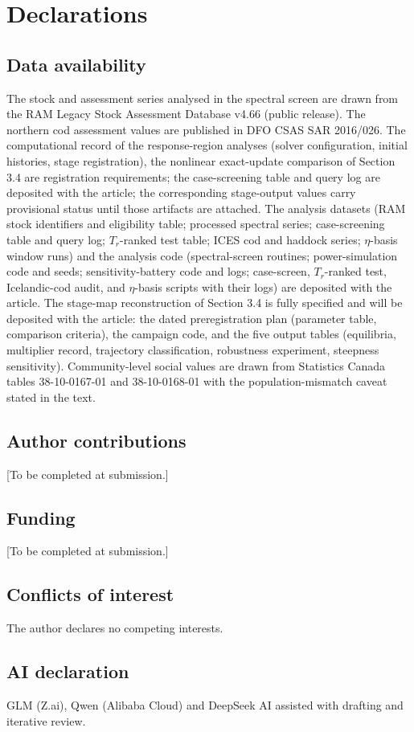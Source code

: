 \documentclass[11pt]{article}
\begin{document}
\section*{Declarations}

\subsection*{Data availability}

The stock and assessment series analysed in the spectral screen are
drawn from the RAM Legacy Stock Assessment Database v4.66 (public
release). The northern cod assessment values are published in DFO CSAS
SAR 2016/026. The computational record of the response-region analyses
(solver configuration, initial histories, stage registration), the nonlinear exact-update comparison of Section 3.4 are registration requirements; the case-screening table and query log are deposited with the article; the
corresponding stage-output values carry provisional status until those
artifacts are attached. The analysis datasets (RAM stock identifiers and eligibility table; processed spectral series; case-screening table and query log; \(T_r\)-ranked test table; ICES cod and haddock series; \(\eta\)-basis window runs) and the analysis code (spectral-screen routines; power-simulation code and seeds; sensitivity-battery code and logs; case-screen, \(T_r\)-ranked test, Icelandic-cod audit, and \(\eta\)-basis scripts with their logs) are deposited with the article. The stage-map reconstruction of Section 3.4 is
fully specified and will be deposited with the article: the dated
preregistration plan (parameter table, comparison criteria), the
campaign code, and the five output tables (equilibria, multiplier
record, trajectory classification, robustness experiment, steepness
sensitivity). Community-level social values are drawn from Statistics
Canada tables 38-10-0167-01 and 38-10-0168-01 with the
population-mismatch caveat stated in the text.

\subsection*{Author contributions}

{[}To be completed at submission.{]}

\subsection*{Funding}

{[}To be completed at submission.{]}

\subsection*{Conflicts of interest}

The author declares no competing interests.

\subsection*{AI declaration}
GLM (Z.ai), Qwen (Alibaba Cloud) and DeepSeek AI assisted with drafting and iterative review.
\end{document}
